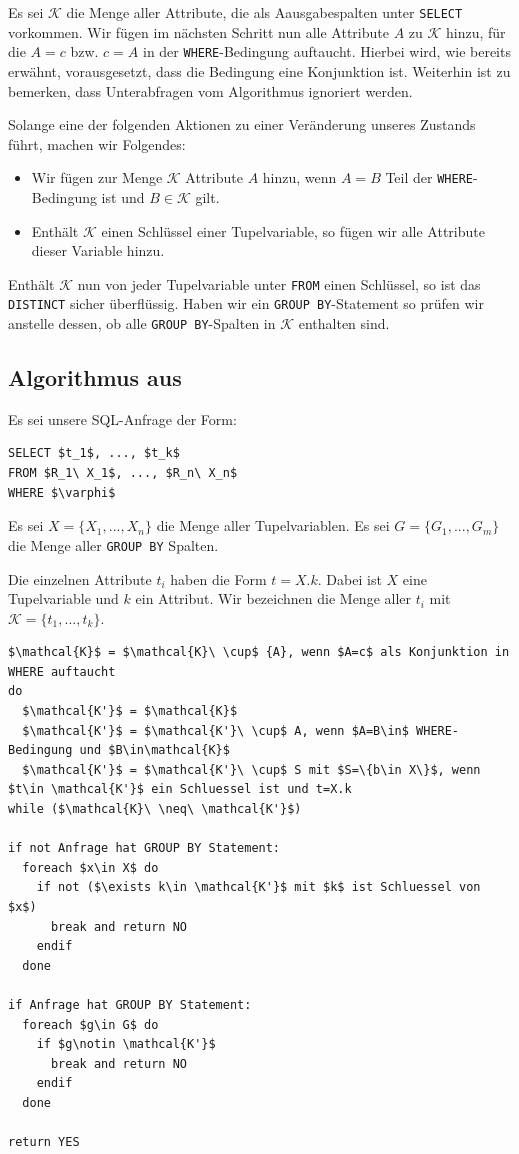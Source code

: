 Es sei $\mathcal{K}$ die Menge aller Attribute, die als Aausgabespalten unter \verb|SELECT| vorkommen.
Wir fügen im nächsten Schritt nun alle Attribute $A$ zu $\mathcal{K}$ hinzu, für die $A=c$ bzw. $c=A$ in der \verb|WHERE|-Bedingung auftaucht. Hierbei wird, wie bereits erwähnt, vorausgesetzt, dass die Bedingung eine Konjunktion ist. Weiterhin ist zu bemerken, dass Unterabfragen vom Algorithmus ignoriert werden.

Solange eine der folgenden Aktionen zu einer Veränderung unseres Zustands führt, machen wir Folgendes:
\begin{itemize}
\item Wir fügen zur Menge $\mathcal{K}$ Attribute $A$ hinzu, wenn $A=B$ Teil der \verb|WHERE|-Bedingung ist und $B\in \mathcal{K}$ gilt.
\item Enthält $\mathcal{K}$ einen Schlüssel einer Tupelvariable, so fügen wir alle Attribute dieser Variable hinzu.
\end{itemize}

Enthält $\mathcal{K}$ nun von jeder Tupelvariable unter \verb|FROM| einen Schlüssel, so ist das \verb|DISTINCT| sicher überflüssig. Haben wir ein \verb|GROUP BY|-Statement so prüfen wir anstelle dessen, ob alle \verb|GROUP BY|-Spalten in $\mathcal{K}$ enthalten sind.

\subsection{Algorithmus aus \cite{sql1folien}}

Es sei unsere SQL-Anfrage der Form:

\begin{lstlisting}[mathescape]
SELECT $t_1$, ..., $t_k$
FROM $R_1\ X_1$, ..., $R_n\ X_n$
WHERE $\varphi$
\end{lstlisting}

Es sei $X=\{X_1, ..., X_n\}$ die Menge aller Tupelvariablen. Es sei $G=\{G_1, ..., G_m\}$ die Menge aller \verb|GROUP BY| Spalten.

Die einzelnen Attribute $t_i$ haben die Form $t = X.k$. Dabei ist $X$ eine Tupelvariable und $k$ ein Attribut. Wir bezeichnen die Menge aller $t_i$ mit $\mathcal{K}=\{t_1,...,t_k\}$.

\begin{lstlisting}[mathescape]
$\mathcal{K}$ = $\mathcal{K}\ \cup$ {A}, wenn $A=c$ als Konjunktion in WHERE auftaucht
do 
  $\mathcal{K'}$ = $\mathcal{K}$
  $\mathcal{K'}$ = $\mathcal{K'}\ \cup$ A, wenn $A=B\in$ WHERE-Bedingung und $B\in\mathcal{K}$
  $\mathcal{K'}$ = $\mathcal{K'}\ \cup$ S mit $S=\{b\in X\}$, wenn $t\in \mathcal{K'}$ ein Schluessel ist und t=X.k
while ($\mathcal{K}\ \neq\ \mathcal{K'}$)

if not Anfrage hat GROUP BY Statement:
  foreach $x\in X$ do
    if not ($\exists k\in \mathcal{K'}$ mit $k$ ist Schluessel von $x$)
      break and return NO
    endif
  done

if Anfrage hat GROUP BY Statement:
  foreach $g\in G$ do
    if $g\notin \mathcal{K'}$
      break and return NO
    endif
  done

return YES
\end{lstlisting}


